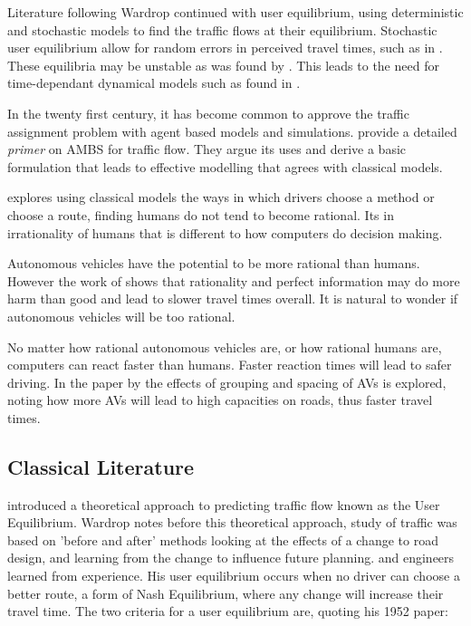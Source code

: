 \documentclass[12pt, a4paper, onecolumn]{article}
\begin{document}
Literature following Wardrop continued with user equilibrium, using deterministic and stochastic models to find the traffic flows at their equilibrium. Stochastic user equilibrium allow for random errors in perceived travel times, such as in \cite{Daganzo1977}. These equilibria may be unstable as was found by \cite{Horowitz1984}. This leads to the need for time-dependant dynamical models such as found in \cite{Hazelton2016}. 

In the twenty first century, it has become common to approve the traffic assignment problem with agent based models and simulations. \cite{Zheng2013} provide a detailed \textit{primer} on AMBS for traffic flow. They argue its uses and derive a basic formulation that leads to effective modelling that agrees with classical models. 

\cite{Nakayama2001} explores using classical models the ways in which drivers choose a method or choose a route, finding humans do not tend to become rational. Its in irrationality of humans that is different to how computers do decision making.

Autonomous vehicles have the potential to be more rational than humans. However the work of \cite{Liu2007} shows that rationality and perfect information may do more harm than good and lead to slower travel times overall. It is natural to wonder if autonomous vehicles will be too rational.

No matter how rational autonomous vehicles are, or how rational humans are, computers can react faster than humans. Faster reaction times will lead to safer driving. In the paper by \cite{chen2017} the effects of grouping and spacing of AVs is explored, noting how more AVs will lead to high capacities on roads, thus faster travel times.


\subsection{Classical Literature}
\cite{Wardrop1952} introduced a theoretical approach to predicting traffic flow known as the User Equilibrium. Wardrop notes before this theoretical approach, study of traffic was based on 'before and after' methods looking at the effects of a change to road design, and learning from the change to influence future planning. and engineers learned from experience. His user equilibrium occurs when no driver can choose a better route, a form of Nash Equilibrium, where any change will increase their travel time. The two criteria for a user equilibrium are, quoting his 1952 paper:
\end{document}
